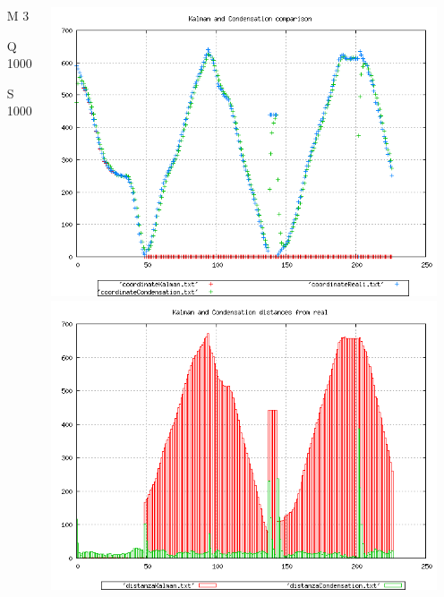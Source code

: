 {\begin{columns}
\begin{scriptsize}
\begin{itemize}
\item [M]3
\item [Q]1000
\item [S]1000
\end{itemize}
\end{scriptsize}
\includegraphics[scale=0.1]{../esperimenti/single_car/mod_3-Q_1000-S_1000/plot.png}\\
\includegraphics[scale=0.1]{../esperimenti/single_car/mod_3-Q_1000-S_1000/plot-distances.png}


\end{columns}}
